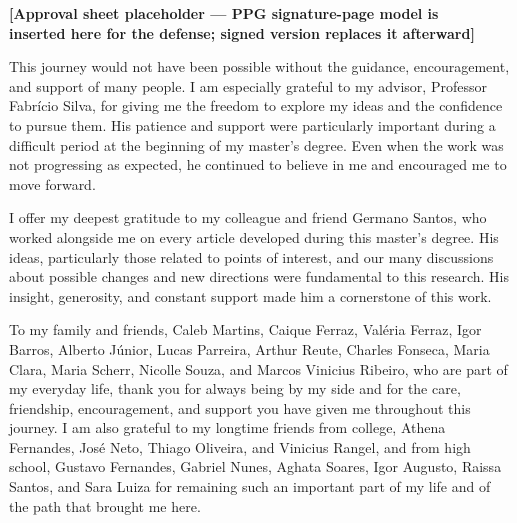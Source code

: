 

    \frenchspacing
    \OnehalfSpacing

    \pretextual

    \ifdefensebuild
    {
        \singlespacing
        \imprimirfolhaderosto
        \clearpage
    }
    \ifapprovalsheet
    \begin{center}
        \vspace*{2cm}
        {\large\bfseries [Approval sheet placeholder --- PPG signature-page model is\\
        inserted here for the defense; signed version replaces it afterward]}
        \vspace*{\fill}
    \end{center}
    \clearpage
    \fi

    \ifdefensebuild
    \begin{agradecimentos}
        \singlespacing
        This journey would not have been possible without the guidance, encouragement, and support of many people. I am
        especially grateful to my advisor, Professor Fabrício Silva, for giving me the freedom to explore my ideas and
        the confidence to pursue them. His patience and support were particularly important during a difficult period at
        the beginning of my master’s degree. Even when the work was not progressing as expected, he continued to believe
        in me and encouraged me to move forward.

        I offer my deepest gratitude to my colleague and friend Germano Santos, who worked alongside me on every article
        developed during this master’s degree. His ideas, particularly those related to points of interest, and our many
        discussions about possible changes and new directions were fundamental to this research. His insight,
        generosity, and constant support made him a cornerstone of this work.

        To my family and friends, Caleb Martins, Caique Ferraz, Valéria Ferraz, Igor Barros, Alberto Júnior, Lucas
        Parreira, Arthur Reute, Charles Fonseca, Maria Clara, Maria Scherr, Nicolle Souza, and Marcos Vinicius Ribeiro, who
        are part of my everyday life, thank you for always being by my side and for the care, friendship, encouragement,
        and support you have given me throughout this journey. I am also grateful to my longtime friends from college, Athena
        Fernandes, José Neto, Thiago Oliveira, and Vinicius Rangel, and from high school, Gustavo Fernandes, Gabriel
        Nunes, Aghata Soares, Igor Augusto, Raissa Santos, and Sara Luiza for remaining such an important part of my
        life and of the path that brought me here.


\end{agradecimentos}
